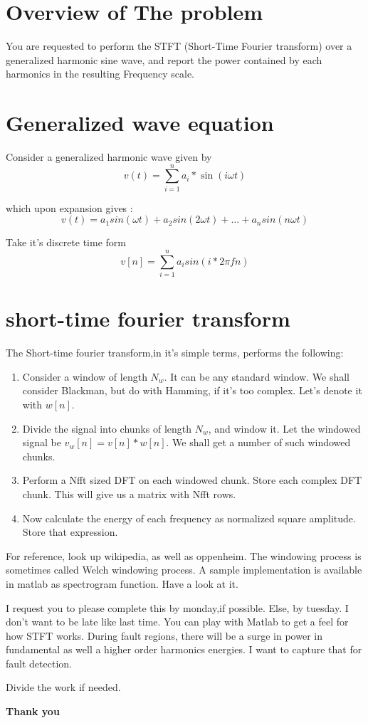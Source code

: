 \documentclass[12pt, onecolumn]{ieeetran}
\begin{document}
	\section{Overview of The problem}
	 You are requested to perform the STFT (Short-Time Fourier transform) over a generalized harmonic  sine wave, and report the power contained by each harmonics in the resulting Frequency scale.
	 
	 \section{Generalized wave equation}
	 Consider a generalized harmonic wave given by 
	 \begin{equation}
	 v(t) = \sum_{i=1}^{n}{a_{i}*\sin(i\omega t)}
	 \end{equation}
	 
	 which upon expansion gives :
	 $$
	 	v(t) = a_{1}sin(\omega t)+a_{2}sin(2\omega t)+\ldots+a_{n}sin(n\omega t)
	 $$
	 
	 
	 Take it's discrete time form 
	 \begin{equation}
	 v[n] = \sum_{i=1}^{n}{a_{i}sin(i*2\pi f n)}
	 \end{equation}
	 
	 \section{short-time fourier transform} The Short-time fourier transform,in it's simple terms, performs the following:
	 \begin{enumerate}
	 \item Consider a window of length $N_{w}$. It can be any standard window. We shall consider Blackman, but do with Hamming, if it's too complex. Let's denote it with $w[n]$.
	 \item Divide the signal into chunks of length $N_{w}$, and window it. Let the windowed signal be $v_{w}[n] = v[n]*w[n]$. We shall get a number of such windowed chunks.
	 
	 \item Perform a Nfft sized DFT on each windowed chunk. Store each complex DFT chunk. This will give us a matrix with Nfft rows.
	 
	 \item Now calculate the energy of each frequency as normalized square amplitude. Store that expression.
	 
	    
	 \end{enumerate}
	 
	 
	 For reference, look up wikipedia, as well as oppenheim. The windowing process is sometimes called Welch windowing process. A sample implementation is available in matlab as spectrogram function. Have a look at it.
	 
	 
	 I request you to please complete this by monday,if possible. Else, by tuesday. I don't want to be late like last time. You can play with Matlab to get a feel for how STFT works. During fault regions, there will be a surge in power in fundamental as well a higher order harmonics energies. I want to capture that for fault detection. 
	 
	 
	 Divide the work if needed. 
	 
	 
	 \centering \textbf{Thank you}
\end{document}
